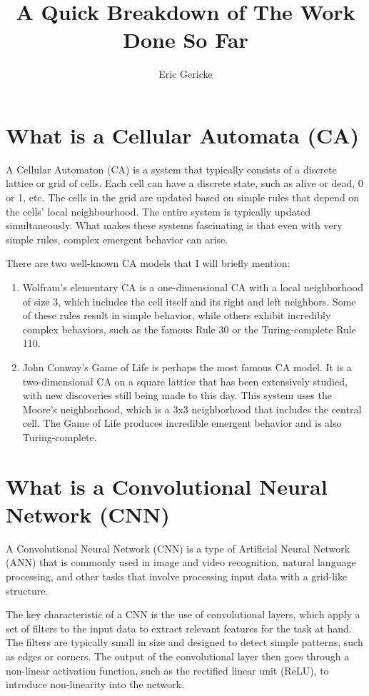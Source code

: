 \documentclass{article}
\title{A Quick Breakdown of The Work Done So Far}
\author{Eric Gericke}
\begin{document}
\maketitle
\tableofcontents

\section{What is a Cellular Automata (CA)}
	A Cellular Automaton (CA) is a system that typically consists of a discrete lattice or grid of cells. Each cell can have a discrete state, such as alive or dead, 0 or 1, etc. The cells in the grid are updated based on simple rules that depend on the cells' local neighbourhood. The entire system is typically updated simultaneously. What makes these systems fascinating is that even with very simple rules, complex emergent behavior can arise.
	
	There are two well-known CA models that I will briefly mention:
	\begin{enumerate}
		\item Wolfram's elementary CA is a one-dimensional CA with a local neighborhood of size 3, which includes the cell itself and its right and left neighbors. Some of these rules result in simple behavior, while others exhibit incredibly complex behaviors, such as the famous Rule 30 or the Turing-complete Rule 110.
		
		\item John Conway's Game of Life is perhaps the most famous CA model. It is a two-dimensional CA on a square lattice that has been extensively studied, with new discoveries still being made to this day. This system uses the Moore's neighborhood, which is a 3x3 neighborhood that includes the central cell. The Game of Life produces incredible emergent behavior and is also Turing-complete.
		
	\end{enumerate}
	
	
\section{What is a Convolutional Neural Network (CNN)}
	A Convolutional Neural Network (CNN) is a type of Artificial Neural Network (ANN) that is commonly used in image and video recognition, natural language processing, and other tasks that involve processing input data with a grid-like structure.
	
	The key characteristic of a CNN is the use of convolutional layers, which apply a set of filters to the input data to extract relevant features for the task at hand. The filters are typically small in size and designed to detect simple patterns, such as edges or corners. The output of the convolutional layer then goes through a non-linear activation function, such as the rectified linear unit (ReLU), to introduce non-linearity into the network.
	
\end{document}

